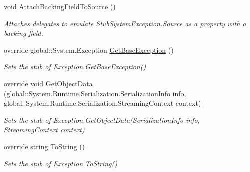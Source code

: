 \begin{DoxyCompactItemize}
void \hyperlink{class_system_1_1_fakes_1_1_stub_system_exception_a1fa85add480f5b0e97c185ad90ab8f0b}{Attach\-Backing\-Field\-To\-Source} ()
\begin{DoxyCompactList}\small\item\em Attaches delegates to emulate \hyperlink{class_system_1_1_fakes_1_1_stub_system_exception_aa7469c10ee90b95fdbf91b961d3497e2}{Stub\-System\-Exception.\-Source} as a property with a backing field.\end{DoxyCompactList}\item 
override global\-::\-System.\-Exception \hyperlink{class_system_1_1_fakes_1_1_stub_system_exception_abe84439f36f7febe95db80304260005d}{Get\-Base\-Exception} ()
\begin{DoxyCompactList}\small\item\em Sets the stub of Exception.\-Get\-Base\-Exception()\end{DoxyCompactList}\item 
override void \hyperlink{class_system_1_1_fakes_1_1_stub_system_exception_a76d436752673f8765566fa2413596c96}{Get\-Object\-Data} (global\-::\-System.\-Runtime.\-Serialization.\-Serialization\-Info info, global\-::\-System.\-Runtime.\-Serialization.\-Streaming\-Context context)
\begin{DoxyCompactList}\small\item\em Sets the stub of Exception.\-Get\-Object\-Data(\-Serialization\-Info info, Streaming\-Context context)\end{DoxyCompactList}\item 
override string \hyperlink{class_system_1_1_fakes_1_1_stub_system_exception_aa8e786798b416b8807ef58de75cbdb3d}{To\-String} ()
\begin{DoxyCompactList}\small\item\em Sets the stub of Exception.\-To\-String()\end{DoxyCompactList}\end{DoxyCompactItemize}
